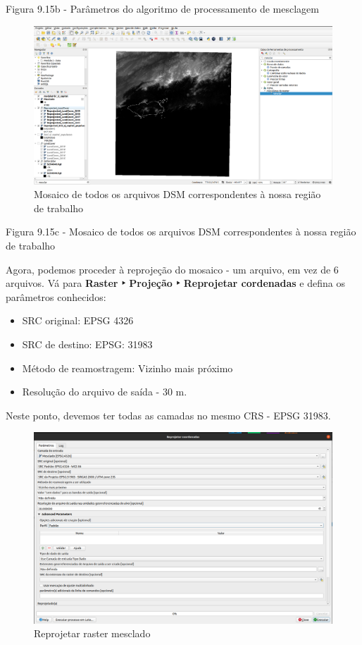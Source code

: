 \documentclass[
]{book}
\providecommand{\tightlist}{%
  \setlength{\itemsep}{0pt}\setlength{\parskip}{0pt}}
\begin{document}
Figura 9.15b - Parâmetros do algoritmo de processamento de mesclagem

\begin{figure}
\centering
\includegraphics{media/modulo9/fig915_c.png}
\caption{Mosaico de todos os arquivos DSM correspondentes à nossa região de trabalho}
\end{figure}

Figura 9.15c - Mosaico de todos os arquivos DSM correspondentes à nossa região de trabalho

Agora, podemos proceder à reprojeção do mosaico - um arquivo, em vez de 6 arquivos. Vá para \textbf{Raster ‣ Projeção ‣ Reprojetar cordenadas} e defina os parâmetros conhecidos:

\begin{itemize}
\tightlist
\item
  SRC original: EPSG 4326
\item
  SRC de destino: EPSG: 31983
\item
  Método de reamostragem: Vizinho mais próximo
\item
  Resolução do arquivo de saída - 30 m.
\end{itemize}

Neste ponto, devemos ter todas as camadas no mesmo CRS - EPSG 31983.

\begin{figure}
\centering
\includegraphics{media/modulo9/fig915_d.png}
\caption{Reprojetar raster mesclado}
\end{figure}
\end{document}
